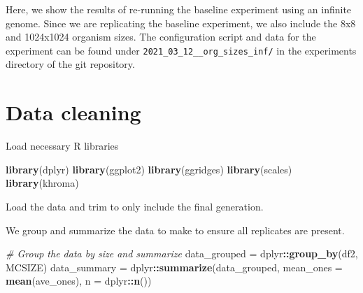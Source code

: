 \documentclass[
]{book}
\newenvironment{Shaded}{\begin{snugshade}}{\end{snugshade}}
\newcommand{\CommentTok}[1]{\textcolor[rgb]{0.56,0.35,0.01}{\textit{#1}}}
\newcommand{\DataTypeTok}[1]{\textcolor[rgb]{0.13,0.29,0.53}{#1}}
\newcommand{\DecValTok}[1]{\textcolor[rgb]{0.00,0.00,0.81}{#1}}
\newcommand{\KeywordTok}[1]{\textcolor[rgb]{0.13,0.29,0.53}{\textbf{#1}}}
\newcommand{\NormalTok}[1]{#1}
\newcommand{\OperatorTok}[1]{\textcolor[rgb]{0.81,0.36,0.00}{\textbf{#1}}}
\newcommand{\StringTok}[1]{\textcolor[rgb]{0.31,0.60,0.02}{#1}}
\begin{document}
Here, we show the results of re-running the baseline experiment using an infinite genome.
Since we are replicating the baseline experiment, we also include the 8x8 and 1024x1024 organism sizes.
The configuration script and data for the experiment can be found under \texttt{2021\_03\_12\_\_org\_sizes\_inf/} in the experiments directory of the git repository.

\hypertarget{data-cleaning-7}{%
\section{Data cleaning}\label{data-cleaning-7}}

Load necessary R libraries

\begin{Shaded}
\begin{Highlighting}[]
\KeywordTok{library}\NormalTok{(dplyr)}
\KeywordTok{library}\NormalTok{(ggplot2)}
\KeywordTok{library}\NormalTok{(ggridges)}
\KeywordTok{library}\NormalTok{(scales)}
\KeywordTok{library}\NormalTok{(khroma)}
\end{Highlighting}
\end{Shaded}

Load the data and trim to only include the final generation.

\begin{Shaded}
\end{Shaded}

We group and summarize the data to make to ensure all replicates are present.

\begin{Shaded}
\begin{Highlighting}[]
\CommentTok{\# Group the data by size and summarize}
\NormalTok{data\_grouped =}\StringTok{ }\NormalTok{dplyr}\OperatorTok{::}\KeywordTok{group\_by}\NormalTok{(df2, MCSIZE)}
\NormalTok{data\_summary =}\StringTok{ }\NormalTok{dplyr}\OperatorTok{::}\KeywordTok{summarize}\NormalTok{(data\_grouped, }\DataTypeTok{mean\_ones =} \KeywordTok{mean}\NormalTok{(ave\_ones), }\DataTypeTok{n =}\NormalTok{ dplyr}\OperatorTok{::}\KeywordTok{n}\NormalTok{())}
\end{Highlighting}
\end{Shaded}
\end{document}

